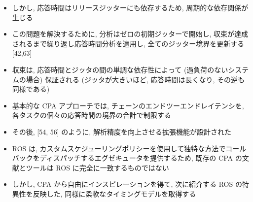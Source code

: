 {    \begin{frame}{}
        \begin{itemize}
            \item しかし, 応答時間はリリースジッターにも依存するため, 周期的な依存関係が生じる
            \item この問題を解決するために, 分析はゼロの初期ジッターで開始し, 収束が達成されるまで繰り返し応答時間分析を適用し, 全てのジッター境界を更新する [42,63]
            \item 収束は, 応答時間とジッタの間の単調な依存性によって (過負荷のないシステムの場合) 保証される (ジッタが大きいほど, 応答時間は長くなり, その逆も同様である)
            \item 基本的な CPA アプローチでは, チェーンのエンドツーエンドレイテンシを, 各タスクの個々の応答時間の境界の合計で制限する
            \item その後, [54, 56] のように, 解析精度を向上させる拡張機能が設計された
        \end{itemize}
    \end{frame}

    \begin{frame}{}
        \begin{itemize}
            \item ROS は, カスタムスケジューリングポリシーを使用して独特な方法でコールバックをディスパッチするエグゼキュータを提供するため, 既存の CPA の文献とツールは ROS に完全に一致するものではない
            \item しかし, CPA から自由にインスピレーションを得て, 次に紹介する ROS の特異性を反映した, 同様に柔軟なタイミングモデルを取得する
        \end{itemize}
    \end{frame}
}
